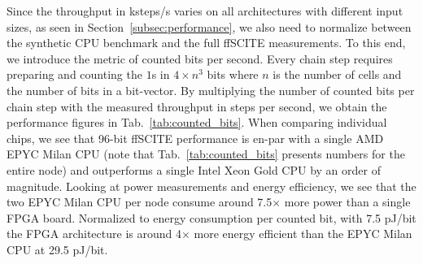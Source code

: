 Since the throughput in ksteps/s varies on all architectures with different input sizes, as seen in Section~\ref{subsec:performance}, we also need to normalize between the synthetic CPU benchmark and the full \ac{ffSCITE} measurements. 
To this end, we introduce the metric of counted bits per second. %
Every chain step requires preparing and counting the $1$s in $4 \times n^3$ bits where $n$ is the number of cells and the number of bits in a bit-vector. By multiplying the number of counted bits per chain step with the measured throughput in steps per second, we obtain the performance figures in Tab.~\ref{tab:counted_bits}. When comparing individual chips, we see that 96-bit \ac{ffSCITE} performance is en-par with a single AMD EPYC Milan CPU (note that Tab.~\ref{tab:counted_bits} presents numbers for the entire node) and outperforms a single Intel Xeon Gold CPU by an order of magnitude. 
Looking at power measurements and energy efficiency, we see that the two EPYC Milan CPU per node consume around 7.5$\times$ more power than a single FPGA board. Normalized to energy consumption per counted bit, with 7.5 pJ/bit the FPGA architecture is around 4$\times$ more energy efficient than the EPYC Milan CPU at 29.5 pJ/bit.
